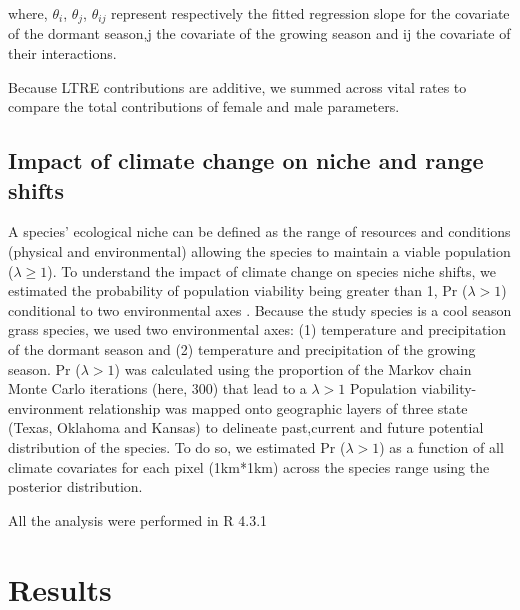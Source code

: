 \documentclass[12pt]{article}
\begin{document}
\noindent where, $\theta_{i}$, $\theta_{j}$, $\theta_{ij}$  represent respectively the fitted regression slope for the covariate of the dormant season,j the covariate of the growing season and ij the covariate of their interactions. 

Because LTRE contributions are additive, we summed across vital rates to compare the total contributions of female and male parameters. 

\subsection*{Impact of climate change on niche and range shifts}
A species' ecological niche can be defined as the range of resources and conditions (physical and environmental) allowing the species to maintain a viable population ($\lambda \geq 1$).
To understand the impact of climate change on species niche shifts, we estimated the probability of  population viability being greater than  1, Pr ($\lambda > 1$) conditional to two environmental axes \citep{diez2014probabilistic}.
Because the study species is a cool season grass species, we used two environmental axes: (1) temperature and precipitation of the dormant season and (2) temperature and precipitation of the growing season. 
Pr ($\lambda > 1$) was calculated using the proportion of the Markov chain Monte Carlo iterations (here, 300) that lead to a $\lambda > 1$
Population viability-environment relationship was mapped onto geographic layers of three state (Texas, Oklahoma and Kansas) to delineate past,current and future potential distribution of the species.
To do so, we estimated Pr ($\lambda > 1$) as a function of all climate covariates for each pixel (1km*1km) across the species range using the posterior distribution. 

All the analysis were performed in R 4.3.1 \citep{RCoreteam}

\section*{Results}
\end{document}
